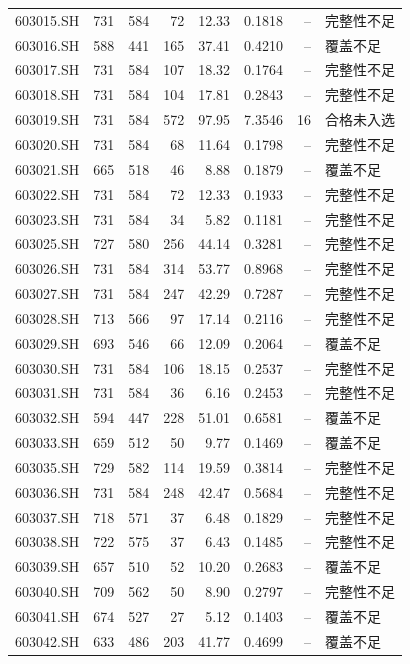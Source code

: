 \documentclass[10pt,a4paper]{article}
\begin{document}
\begin{longtable}{lrrr r r r l}
603015.SH & 731 & 584 & 72 & 12.33 & 0.1818 & -- & 完整性不足\\
603016.SH & 588 & 441 & 165 & 37.41 & 0.4210 & -- & 覆盖不足\\
603017.SH & 731 & 584 & 107 & 18.32 & 0.1764 & -- & 完整性不足\\
603018.SH & 731 & 584 & 104 & 17.81 & 0.2843 & -- & 完整性不足\\
603019.SH & 731 & 584 & 572 & 97.95 & 7.3546 & 16 & 合格未入选\\
603020.SH & 731 & 584 & 68 & 11.64 & 0.1798 & -- & 完整性不足\\
603021.SH & 665 & 518 & 46 & 8.88 & 0.1879 & -- & 覆盖不足\\
603022.SH & 731 & 584 & 72 & 12.33 & 0.1933 & -- & 完整性不足\\
603023.SH & 731 & 584 & 34 & 5.82 & 0.1181 & -- & 完整性不足\\
603025.SH & 727 & 580 & 256 & 44.14 & 0.3281 & -- & 完整性不足\\
603026.SH & 731 & 584 & 314 & 53.77 & 0.8968 & -- & 完整性不足\\
603027.SH & 731 & 584 & 247 & 42.29 & 0.7287 & -- & 完整性不足\\
603028.SH & 713 & 566 & 97 & 17.14 & 0.2116 & -- & 完整性不足\\
603029.SH & 693 & 546 & 66 & 12.09 & 0.2064 & -- & 覆盖不足\\
603030.SH & 731 & 584 & 106 & 18.15 & 0.2537 & -- & 完整性不足\\
603031.SH & 731 & 584 & 36 & 6.16 & 0.2453 & -- & 完整性不足\\
603032.SH & 594 & 447 & 228 & 51.01 & 0.6581 & -- & 覆盖不足\\
603033.SH & 659 & 512 & 50 & 9.77 & 0.1469 & -- & 覆盖不足\\
603035.SH & 729 & 582 & 114 & 19.59 & 0.3814 & -- & 完整性不足\\
603036.SH & 731 & 584 & 248 & 42.47 & 0.5684 & -- & 完整性不足\\
603037.SH & 718 & 571 & 37 & 6.48 & 0.1829 & -- & 完整性不足\\
603038.SH & 722 & 575 & 37 & 6.43 & 0.1485 & -- & 完整性不足\\
603039.SH & 657 & 510 & 52 & 10.20 & 0.2683 & -- & 覆盖不足\\
603040.SH & 709 & 562 & 50 & 8.90 & 0.2797 & -- & 完整性不足\\
603041.SH & 674 & 527 & 27 & 5.12 & 0.1403 & -- & 覆盖不足\\
603042.SH & 633 & 486 & 203 & 41.77 & 0.4699 & -- & 覆盖不足\\

\end{longtable}
\end{document}
